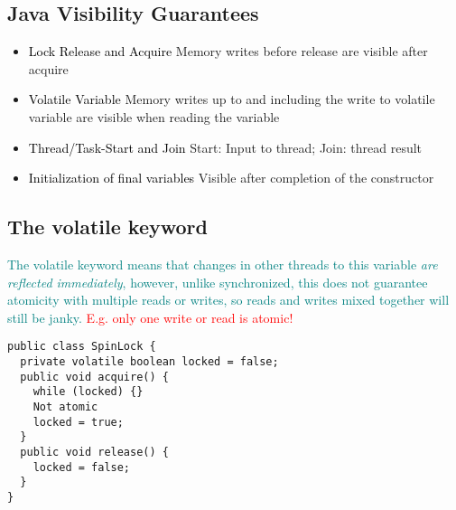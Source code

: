 \documentclass[main.tex,fontsize=8pt,paper=a4,paper=portrait,DIV=calc,]{scrartcl}
\begin{document}
\subsection{Java Visibility Guarantees}
\begin{itemize}
\item \textcolor{black}{Lock Release and Acquire}\newline
  Memory writes before release are visible after acquire
\item \textcolor{black}{Volatile Variable}\newline
  Memory writes up to and including the write to volatile variable are visible when reading the variable
\item \textcolor{black}{Thread/Task-Start and Join}\newline
  Start: Input to thread; Join: thread result
\item \textcolor{black}{Initialization of final variables}\newline
  Visible after completion of the constructor
\end{itemize} 

\subsection{The volatile keyword}
\textcolor{teal}{The volatile keyword means that changes in other threads to this variable \emph{are reflected immediately}, \newline
however, unlike synchronized, this does not guarantee atomicity with multiple reads or writes, so reads and writes mixed together will still be janky.} \newline
\textcolor{red}{E.g. only one write or read is atomic!}
\begin{lstlisting}
public class SpinLock {
  private volatile boolean locked = false;
  public void acquire() {
    while (locked) {}
    Not atomic
    locked = true;
  }
  public void release() {
    locked = false;
  }  
}
\end{lstlisting}
\end{document}
